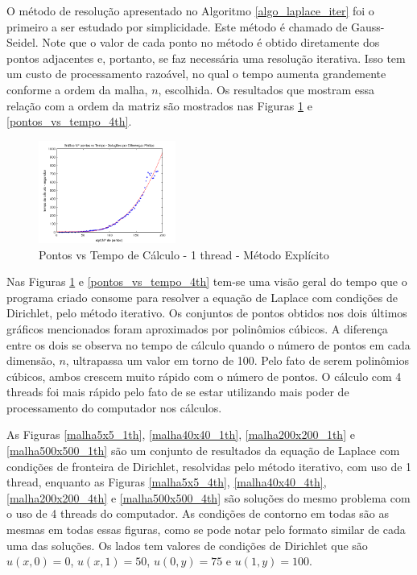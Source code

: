 \documentclass[journal]{IEEEtran}
\begin{document}
O método de resolução apresentado no Algoritmo \ref{algo_laplace_iter} foi o primeiro a ser estudado por simplicidade. Este método é chamado de Gauss-Seidel. Note que o valor de cada ponto no método é obtido diretamente dos pontos adjacentes e, portanto, se faz necessária uma resolução iterativa. Isso tem um custo de processamento razoável, no qual o tempo aumenta grandemente conforme a ordem da malha, $n$, escolhida. Os resultados que mostram essa relação com a ordem da matriz são mostrados nas Figuras \ref{pontos_vs_tempo_1th} e \ref{pontos_vs_tempo_4th}.

\begin{figure}[ht!]
\centering
\includegraphics[width = 0.4\textwidth]{figures/problema01_m1/03.png}
\caption{Pontos vs Tempo de Cálculo - 1 thread - Método Explícito\label{pontos_vs_tempo_1th}}
\end{figure}

Nas Figuras \ref{pontos_vs_tempo_1th} e \ref{pontos_vs_tempo_4th} tem-se uma visão geral do tempo que o programa criado consome para resolver a equação de Laplace com condições de Dirichlet, pelo método iterativo. Os conjuntos de pontos obtidos nos dois últimos gráficos mencionados foram aproximados por polinômios cúbicos. A diferença entre os dois se observa no tempo de cálculo quando o número de pontos em cada dimensão, $n$, ultrapassa um valor em torno de 100. Pelo fato de serem polinômios cúbicos, ambos crescem muito rápido com o número de pontos. O cálculo com 4 threads foi mais rápido pelo fato de se estar utilizando mais poder de processamento do computador nos cálculos.

As Figuras \ref{malha5x5_1th}, \ref{malha40x40_1th}, \ref{malha200x200_1th} e \ref{malha500x500_1th} são um conjunto de resultados da equação de Laplace com condições de fronteira de Dirichlet, resolvidas pelo método iterativo, com uso de 1 thread, enquanto as Figuras \ref{malha5x5_4th}, \ref{malha40x40_4th}, \ref{malha200x200_4th} e \ref{malha500x500_4th} são soluções do mesmo problema com o uso de 4 threads do computador. As condições de contorno em todas são as mesmas em todas essas figuras, como se pode notar pelo formato similar de cada uma das soluções. Os lados tem valores de condições de Dirichlet que são $u(x,0)=0$, $u(x,1)=50$, $u(0,y)=75$ e $u(1,y)=100$. 
\end{document}

